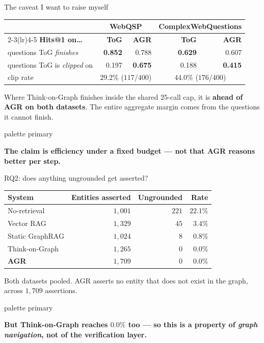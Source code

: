 \documentclass[aspectratio=169,12pt]{beamer}
\newcommand{\takeaway}[1]{%
  \vspace{1.5mm}%
  \begin{beamercolorbox}[wd=\dimexpr\textwidth-4.4mm\relax,sep=2.2mm,
    rounded=true]{palette primary}%
    \color{agrdark}\small\raggedright\textbf{#1}%
  \end{beamercolorbox}}
\begin{document}
\begin{frame}{The caveat I want to raise myself}
  \begin{table}
    \small
    \begin{tabular}{@{}lrrrr@{}}
      \toprule
      & \multicolumn{2}{c}{\textbf{WebQSP}}
      & \multicolumn{2}{c}{\textbf{ComplexWebQuestions}} \\
      \cmidrule(lr){2-3}\cmidrule(lr){4-5}
      \textbf{Hits@1 on\ldots} & \textbf{ToG} & \textbf{AGR}
                               & \textbf{ToG} & \textbf{AGR} \\
      \midrule
      questions ToG \emph{finishes} & \textbf{0.852} & 0.788
                                    & \textbf{0.629} & 0.607 \\
      questions ToG is \emph{clipped} on & 0.197 & \textbf{0.675}
                                    & 0.188 & \textbf{0.415} \\
      \midrule
      clip rate & \multicolumn{2}{c}{$29.2\%$ ($117/400$)}
                & \multicolumn{2}{c}{$44.0\%$ ($176/400$)} \\
      \bottomrule
    \end{tabular}
  \end{table}
  {\small Where Think-on-Graph finishes inside the shared $25$-call cap, it is
  \textbf{ahead of AGR on both datasets}. The entire aggregate margin comes
  from the questions it cannot finish.}
  \takeaway{The claim is efficiency under a fixed budget --- not that AGR
    reasons better per step.}
\end{frame}

\begin{frame}{RQ2: does anything ungrounded get asserted?}
  \begin{table}
    \small
    \begin{tabular}{@{}lrrr@{}}
      \toprule
      \textbf{System} & \textbf{Entities asserted}
                      & \textbf{Ungrounded} & \textbf{Rate} \\
      \midrule
      No-retrieval    & $1{,}001$ & $221$ & $22.1\%$ \\
      Vector RAG      & $1{,}329$ & $45$  & $3.4\%$ \\
      Static GraphRAG & $1{,}024$ & $8$   & $0.8\%$ \\
      Think-on-Graph  & $1{,}265$ & $0$   & $\mathbf{0.0\%}$ \\
      \textbf{AGR}    & $1{,}709$ & $0$   & $\mathbf{0.0\%}$ \\
      \bottomrule
    \end{tabular}
  \end{table}
  \vspace{1mm}
  {\small Both datasets pooled. AGR asserts no entity that does not exist in
  the graph, across $1{,}709$ assertions.}
  \takeaway{\alert{But Think-on-Graph reaches $0.0\%$ too} --- so this is a
    property of \emph{graph navigation}, not of the verification layer.}
\end{frame}
\end{document}
